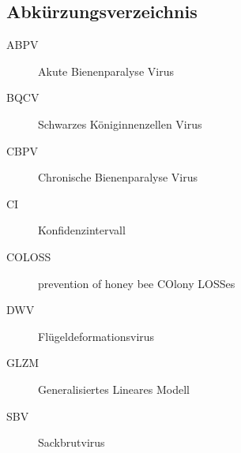 \subsection*{Abkürzungsverzeichnis}
\label{cha:abbr}

\begin{description}
    \item[ABPV]
    Akute Bienenparalyse Virus
    \item[BQCV]
    Schwarzes Königinnenzellen Virus
    \item[CBPV]
    Chronische Bienenparalyse Virus
    \item[CI]
    Konfidenzintervall
    \item[COLOSS]
    prevention of honey bee COlony LOSSes
    \item[DWV]
    Flügeldeformationsvirus
    \item[GLZM]
    Generalisiertes Lineares Modell
    \item[SBV]
    Sackbrutvirus
\end{description}